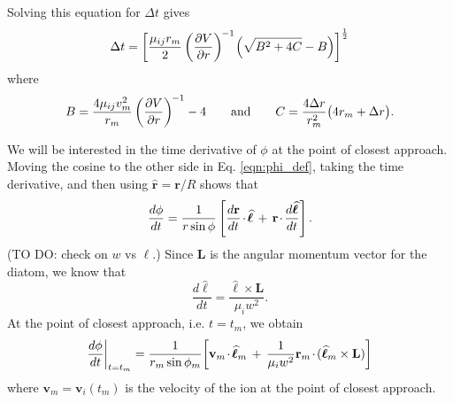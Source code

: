 \documentclass[article]{revtex4-2}
\begin{document}
Solving this equation for $\Delta t$ gives
\begin{equation}
    \Delta t = \bigg[\frac{\mu_{ij}r_m}{2}\left( \frac{\partial V}{\partial r}\right)^{\mkern-2mu -1}\mkern-2mu \Big(\sqrt{B^2+4C}-B\Big)
    \bigg]^{\frac{1}{2}}
    \label{eqn:delta_t_from_delta_r}
\end{equation}
where
\begin{equation}
    B = \frac{4\mu_{ij}v_m^2}{r_m}\left( \frac{\partial V}{\partial r}\right)^{\mkern-2mu -1}-4 \qquad\mbox{and}\qquad C = \frac{4\Delta r}{r_m^2}\big(4r_m + \Delta r\big).
\end{equation}

We will be interested in the time derivative of $\phi$ at the point of closest approach. Moving the cosine to the other side in Eq. \ref{eqn:phi_def}, taking the time derivative, and then using $\mathbf{\widehat{r}} = \mathbf{r}/R$ shows that
\begin{equation}
    \frac{d\phi}{dt} = \frac{1}{r \sin \phi}\left[ \frac{d\mathbf{r}}{dt}\mkern-2mu\cdot\mkern-2mu\widehat{\boldsymbol{\ell}} \,+\, \mathbf{r} \mkern-2mu \cdot \mkern-2mu \frac{d\widehat{\boldsymbol{\ell}}}{dt} \right].
\end{equation}
(TO DO: check on $w$ vs $\ell$.) Since $\mathbf{L}$ is the angular momentum vector for the diatom, we know that
\begin{equation}
    \frac{d\widehat{\boldsymbol{\ell}}}{dt} = \frac{\widehat{\boldsymbol{\ell}} \times \mathbf{L}}{\mu_i w^2}.
\end{equation}
At the point of closest approach, i.e. $t=t_m$, we obtain
\begin{equation}
    \frac{d\phi}{dt}\bigg|_{t=t_m} = \frac{1}{r_m \sin \phi_m}\bigg[ \mathbf{v}_m \mkern-2mu \cdot \mkern-2mu \widehat{\boldsymbol{\ell}}_m \,+\, \frac{1}{\mu_iw^2}\mathbf{r}_m\mkern-2mu \cdot \mkern-2mu (\widehat{\boldsymbol{\ell}}_m \times \mathbf{L}) \bigg]
    \label{eqn:dphi_dt_final}
\end{equation}
where $\mathbf{v}_m = \mathbf{v}_i(t_m)$ is the velocity of the ion at the point of closest approach.
\end{document}
